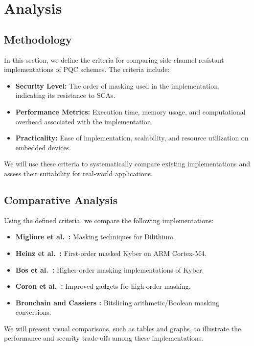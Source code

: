 \chapter{Analysis}

\section{Methodology}

In this section, we define the criteria for comparing side-channel resistant implementations of PQC schemes. The criteria include:

\begin{itemize}
    \item \textbf{Security Level:} The order of masking used in the implementation, indicating its resistance to SCAs.
    \item \textbf{Performance Metrics:} Execution time, memory usage, and computational overhead associated with the implementation.
    \item \textbf{Practicality:} Ease of implementation, scalability, and resource utilization on embedded devices.
\end{itemize}

We will use these criteria to systematically compare existing implementations and assess their suitability for real-world applications.

\section{Comparative Analysis}

Using the defined criteria, we compare the following implementations:

\begin{itemize}
    \item \textbf{Migliore et al.\ \cite{Migliore19}:} Masking techniques for Dilithium.
    \item \textbf{Heinz et al.\ \cite{Heinz20}:} First-order masked Kyber on ARM Cortex-M4.
    \item \textbf{Bos et al.\ \cite{Bos21}:} Higher-order masking implementations of Kyber.
    \item \textbf{Coron et al.\ \cite{Coron23}:} Improved gadgets for high-order masking.
    \item \textbf{Bronchain and Cassiers \cite{Bronchain22}:} Bitslicing arithmetic/Boolean masking conversions.
\end{itemize}

We will present visual comparisons, such as tables and graphs, to illustrate the performance and security trade-offs among these implementations.
